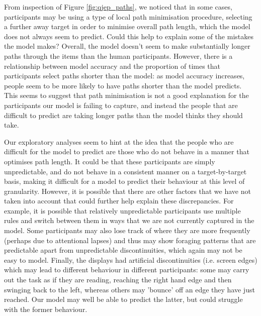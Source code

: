 \documentclass[preprints, article,submit,pdftex,moreauthors]{Definitions/mdpi}
\begin{document}
From inspection of Figure \ref{fig:qjep_paths}, we noticed that in some cases, participants may be using a type of local path minimisation procedure, selecting a further away target in order to minimise overall path length, which the model does not always seem to predict. Could this help to explain some of the mistakes the model makes? Overall, the model doesn't seem to make substantially longer paths through the items than the human participants. However, there is a relationship between model accuracy and the proportion of times that participants select paths shorter than the model: as model accuracy increases, people seem to be more likely to have paths shorter than the model predicts. This seems to suggest that path minimisation is not a good explanation for the participants our model is failing to capture, and instead the people that are difficult to predict are taking longer paths than the model thinks they should take.

Our exploratory analyses seem to hint at the idea that the people who are difficult for the model to predict are those who do not behave in a manner that optimises path length. It could be that these participants are simply unpredictable, and do not behave in a consistent manner on a target-by-target basis, making it difficult for a model to predict their behaviour at this level of granularity. However, it is possible that there are other factors that we have not taken into account that could further help explain these discrepancies. For example, it is possible that relatively unpredictable participants use multiple rules and switch between them in ways that we are not currently captured in the model. Some participants may also lose track of where they are more frequently (perhaps due to attentional lapses) and thus may show foraging patterns that are predictable apart from unpredictable discontinuities, which again may not be easy to model. Finally, the displays had artificial discontinuities (i.e. screen edges) which may lead to different behaviour in different participants: some may carry out the task as if they are reading, reaching the right hand edge and then swinging back to the left, whereas others may 'bounce' off an edge they have just reached. Our model may well be able to predict the latter, but could struggle with the former behaviour.
\end{document}
